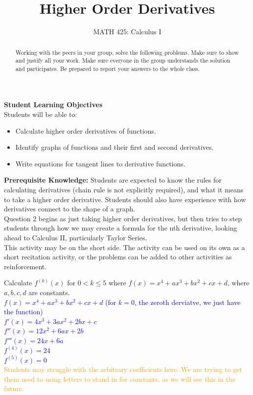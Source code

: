 \documentclass{ximera}
\title{Higher Order Derivatives}
\author{MATH 425: Calculus I}
\begin{document}
\begin{abstract}
    Working with the peers in your group, solve the following problems. Make sure to show and justify all your work. Make sure everyone in the group understands the solution and participates. Be prepared to report your answers to the whole class. 
\end{abstract}
\maketitle


\textbf{Student Learning Objectives}\\
Students will be able to:
    \begin{itemize}
        \item Calculate higher order derivatives of functions.
        \item Identify graphs of functions and their first and second derivatives.
        \item Write equations for tangent lines to derivative functions.
    \end{itemize}

\textbf{Prerequisite Knowledge:} Students are expected to know the rules for calculating derivatives (chain rule is not explicitly required), and what it means to take a higher order derivative.  Students should also have experience with how derivatives connect to the shape of a graph.\\

Question 2 begins as just taking higher order derivatives, but then tries to step students through how we may create a formula for the nth derivative, looking ahead to Calculus II, particularly Taylor Series.  \\

This activity may be on the short side.  The activity can be used on its own as a short recitation activity, or the problems can be added to other activities as reinforcement. 

\begin{exercise}
    Calculate $f^{(k)}(x)$ for $0<k\leq 5$ where $f(x)=x^4+ax^3+bx^2+cx+d$, where $a,b,c,d$ are constants.\\
    \textcolor{blue}{ $f(x)=x^4+ax^3+bx^2+cx+d$ (for $k=0$, the zeroth derviatve, we just have the function)\\
    $f'(x)=4x^3+3ax^2+2bx+c$\\
    $f''(x)=12x^2+6ax+2b$\\
    $f'''(x)=24x+6a$\\
    $f^{(4)}(x)=24$\\
    $f^{(5)}(x)=0$}\\
    \textcolor{orange}{Students may struggle with the arbitrary coefficients here.  We are trying to get them used to using letters to stand in for constants, as we will see this in the future.}
\end{exercise}
\end{document}
